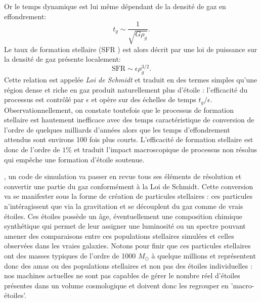 Or le temps dynamique est lui même dépendant de la densité de gaz en effondrement:
\begin{equation}
t_g\sim\frac{1}{\sqrt{G\rho_g}}.
\end{equation}
Le taux de formation stellaire (SFR ) est alors décrit par une loi de puissance sur la densité de gaz présente localement:
\begin{equation}
\mathrm{SFR}\sim \epsilon \rho_g^{3/2}.
\label{e:schmidt}
\end{equation}
Cette relation est appelée \textit{Loi de Schmidt} et traduit en des termes simples qu'une région dense et riche en gaz produit naturellement plus d'étoile : l'efficacité du processus est contrôlé par $\epsilon$ et opère sur des échelles de temps $t_g/\epsilon$. Observationnellement, on constate toutefois que le processus de formation stellaire est hautement inefficace avec des temps caractéristique de conversion de l'ordre de quelques milliards d'années alors que les temps d'effondrement attendus sont environs 100 fois plus courts. L'efficacité de formation stellaire est donc de l'ordre de $1\%$ et traduit l'impact macroscopique de processus non résolus qui empêche une formation d'étoile soutenue.

, un code de simulation va passer en revue tous ses éléments de résolution et convertir une partie du gaz conformément à la Loi de Schmidt. Cette conversion va se manifester sous la forme de création de particules stellaires : ces particules n'intéragissent que via la gravitation et se découplent du gaz comme de vrais étoiles. Ces étoiles possède un âge, éventuellement une composition chimique synthétique qui permet de leur assigner une luminosité ou un spectre pouvant amener des comparaisons entre ces populations stellaires simulées et celles observées dans les vraies galaxies. Notons pour finir que ces particules stellaires ont des masses typiques de l'ordre de 1000 $M_\odot$ à quelque millions et représentent donc des amas ou des populations stellaires et non pas des étoiles individuelles : nos machines actuelles ne sont pas capables de gérer le nombre réel d'étoiles présentes dans un volume cosmologique et doivent donc les regrouper en 'macro-étoiles'.

